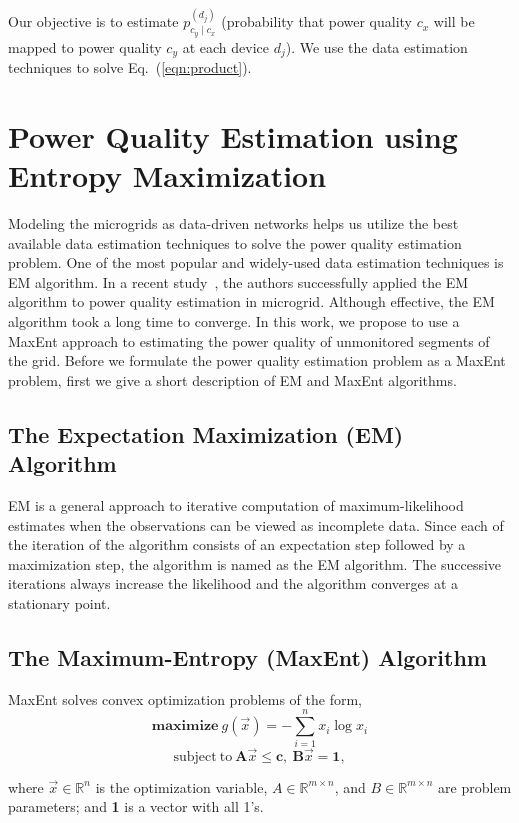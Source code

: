 Our objective is to estimate $p_{c_y \mid c_x}^{(d_j)}$ (probability that power quality $c_x$ will be mapped to power quality $c_y$ at each device $d_j$). We use the data estimation techniques to solve Eq.~(\ref{eqn:product}).

\vspace{0.5cm}
\section{Power Quality Estimation using Entropy Maximization}
\label{sec:formulation}
Modeling the microgrids as data-driven networks helps us utilize the best available data estimation techniques to solve the power quality estimation problem. One of the most popular and widely-used data estimation techniques is EM algorithm. In a recent study~\cite{catherine_pri}, the authors successfully applied the EM algorithm to power quality estimation in microgrid. Although effective, the EM algorithm took a long time to converge. In this work, we propose to use a MaxEnt approach to estimating the power quality of unmonitored segments of the grid. Before we formulate the power quality estimation problem as a MaxEnt problem, first we give a short description of EM and MaxEnt algorithms.

\vspace{0.5cm}
\subsection{The Expectation Maximization (EM) Algorithm} EM is a general approach to iterative computation of maximum-likelihood estimates when the observations can be viewed as incomplete data. Since each of the iteration of the algorithm consists of an expectation step followed by a maximization step, the algorithm is named as the EM algorithm. The successive iterations always increase the likelihood and the algorithm converges at a stationary point.

\vspace{0.5cm}
\subsection{The Maximum-Entropy (MaxEnt) Algorithm} MaxEnt solves convex optimization problems of the form,
\[\mathrm{\mathbf{maximize}}~g(\vec{x}) = - \sum_{i=1}^n x_i \log x_i \]
\[\mathrm{subject~to~} \mathbf{A}\vec{x} \leq \mathbf{c},~ \mathbf{B}\vec{x} = \mathbf{1},\]

where $\vec{x}\in \mathbb{R}^n$ is the optimization variable, $A \in \mathbb{R}^{m \times n}$, and $B \in \mathbb{R}^{m \times n}$ are problem parameters;  and \textbf{1} is a vector with all 1's.

